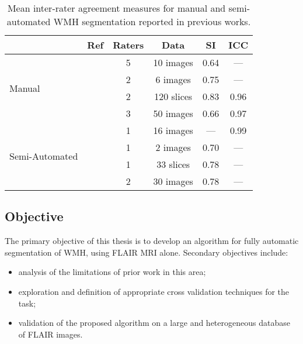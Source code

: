 \par
\begin{table}[h]
  \caption{Mean inter-rater agreement measures for manual and semi-automated WMH segmentation reported in previous works.}
  \centering
  \begin{tabular}{lccccc}
    \hline
                                    &         Ref          & Raters &    Data    &  SI  & ICC  \\ \hline
    \multirow{4}{*}{Manual}         & \cite{Harmouche2006} &   5    & 10 images  & 0.64 & ---  \\
                                    &  \cite{DeBoer2009b}  &   2    &  6 images  & 0.75 & ---  \\
                                    & \cite{Steenwijk2013} &   2    & 120 slices & 0.83 & 0.96 \\
                                    &   \cite{Egger2017}   &   3    & 50 images  & 0.66 & 0.97 \\ \hline
    \multirow{4}{*}{Semi-Automated} &   \cite{Payne2002}   &   1    & 16 images  & ---  & 0.99 \\
                                    &  \cite{Ghazel2006}   &   1    &  2 images  & 0.70 & ---  \\
                                    &  \cite{Kawata2010}   &   1    & 33 slices  & 0.78 & ---  \\
                                    &   \cite{Iorio2013}   &   2    & 30 images  & 0.78 & ---  \\ \hline
  \end{tabular}
  \label{tab:interrater-cite}
\end{table}
\subsection{Objective}
The primary objective of this thesis is to develop an algorithm for fully automatic segmentation of WMH, using FLAIR MRI alone. Secondary objectives include:
\begin{itemize}
  \item analysis of the limitations of prior work in this area;
  \item exploration and definition of appropriate cross validation techniques for the task;
  \item validation of the proposed algorithm on a large and heterogeneous database of FLAIR images.
\end{itemize}
